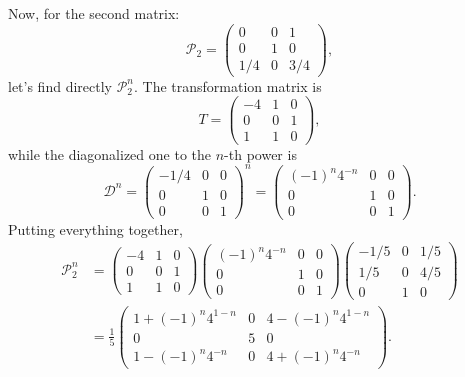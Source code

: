 \documentclass{gulartcl}
\begin{document}
Now, for the second matrix:
\begin{equation}
    \mathcal{P}_{2} =
    \begin{pmatrix}
         0  &  0  &  1  \\
         0  &  1  &  0  \\
        1/4 &  0  & 3/4
    \end{pmatrix},
\end{equation}
let’s find directly $\mathcal{P}_2^{n}$. The transformation matrix is
\begin{equation}
    T =
    \begin{pmatrix}
        -4 & 1 & 0 \\
        0 & 0 & 1 \\
        1 & 1 & 0
    \end{pmatrix},
\end{equation}
while the diagonalized one to the $n$-th power is
\begin{equation}
    \mathcal{D}^{n} =
    \begin{pmatrix}
        -1/4 & 0 & 0 \\
        0 & 1 & 0 \\
        0 & 0 & 1
    \end{pmatrix}^n
    =
    \begin{pmatrix}
        (-1)^{n} 4^{-n} & 0 & 0 \\
        0 & 1 & 0 \\
        0 & 0 & 1
    \end{pmatrix}.
\end{equation}
Putting everything together,
\begin{equation}
\begin{split}
    \mathcal{P}_2^{n} &=
    \begin{pmatrix}
        -4 & 1 & 0 \\
        0 & 0 & 1 \\
        1 & 1 & 0
    \end{pmatrix}
    \begin{pmatrix}
        (-1)^{n} 4^{-n} & 0 & 0 \\
        0 & 1 & 0 \\
        0 & 0 & 1
    \end{pmatrix}
    \begin{pmatrix}
        -1/5 & 0 & 1/5 \\
        1/5 & 0 & 4/5 \\
        0 & 1 & 0
    \end{pmatrix} \\
                      &= \frac{1}{5}
    \begin{pmatrix}
        1 + (-1)^{n} 4^{1-n} & 0 & 4 - (-1)^{n} 4^{1-n} \\
        0 & 5 & 0 \\
        1 - (-1)^{n} 4^{-n} & 0 & 4 + (-1)^{n} 4^{-n}
    \end{pmatrix}.
\end{split}
\end{equation}
\end{document}
